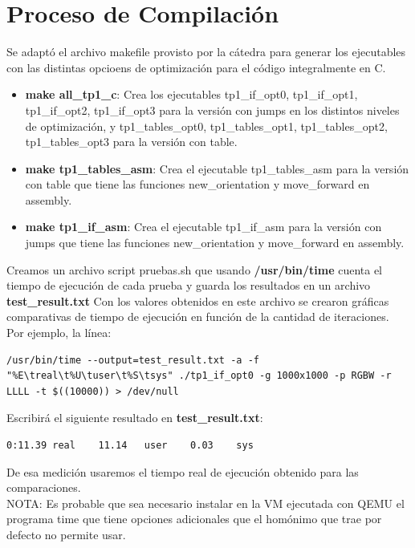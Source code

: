 \documentclass[a4paper, 10pt, twoside, notitlepage]{article}
\begin{document}
\newpage

\section{Proceso de Compilación}

Se adaptó el archivo makefile provisto por la cátedra para generar los ejecutables con las distintas opcioens de optimización para el código integralmente en C.\\

\begin{itemize}
\item[] \textbf{make all\_tp1\_c}: Crea los ejecutables tp1\_if\_opt0, tp1\_if\_opt1, tp1\_if\_opt2, tp1\_if\_opt3 para la versión con jumps en los distintos niveles de optimización, y tp1\_tables\_opt0, tp1\_tables\_opt1, tp1\_tables\_opt2, tp1\_tables\_opt3 para la versión con table.
\item[] \textbf{make tp1\_tables\_asm}: Crea el ejecutable tp1\_tables\_asm para la versión con table que tiene las funciones new\_orientation y move\_forward en assembly.
\item[] \textbf{make tp1\_if\_asm}: Crea el ejecutable tp1\_if\_asm para la versión con jumps que tiene las funciones new\_orientation y move\_forward en assembly.
\end{itemize}

Creamos un archivo script pruebas.sh que usando \textbf{/usr/bin/time} cuenta el tiempo de ejecución de cada prueba y guarda los resultados en un archivo \textbf{test\_result.txt}
Con los valores obtenidos en este archivo se crearon gráficas comparativas de tiempo de ejecución en función de la cantidad de iteraciones.\\

Por ejemplo, la línea:

\scriptsize
\begin{verbatim}
/usr/bin/time --output=test_result.txt -a -f "%E\treal\t%U\tuser\t%S\tsys" ./tp1_if_opt0 -g 1000x1000 -p RGBW -r LLLL -t $((10000)) > /dev/null
\end{verbatim}
\normalsize

Escribirá el siguiente resultado en \textbf{test\_result.txt}:
\scriptsize
\begin{verbatim}
0:11.39	real	11.14	user	0.03	sys
\end{verbatim}
\normalsize

De esa medición usaremos el tiempo real de ejecución obtenido para las comparaciones.\\
NOTA: Es probable que sea necesario instalar en la VM ejecutada con QEMU el programa time que tiene opciones adicionales que el homónimo que trae por defecto no permite usar.\\
\end{document}
